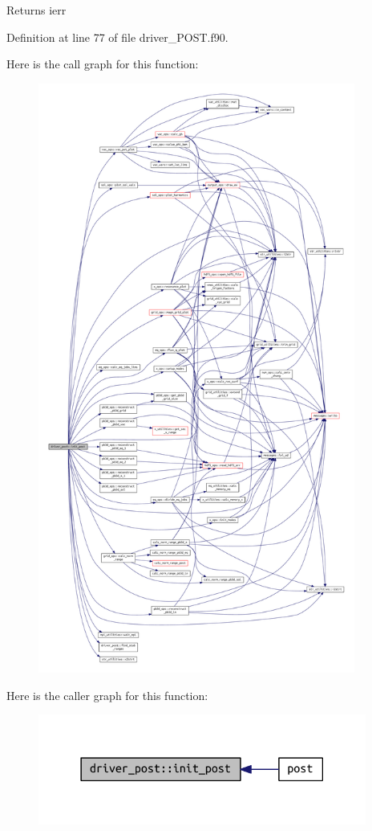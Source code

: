 \begin{DoxyReturn}{Returns}
ierr 
\end{DoxyReturn}


Definition at line 77 of file driver\+\_\+\+P\+O\+S\+T.\+f90.

Here is the call graph for this function\+:
\nopagebreak
\begin{figure}[H]
\begin{center}
\leavevmode
\includegraphics[height=550pt]{namespacedriver__post_af527706d4e696d4e507443d2f74194ef_cgraph}
\end{center}
\end{figure}
Here is the caller graph for this function\+:\nopagebreak
\begin{figure}[H]
\begin{center}
\leavevmode
\includegraphics[width=306pt]{namespacedriver__post_af527706d4e696d4e507443d2f74194ef_icgraph}
\end{center}
\end{figure}
